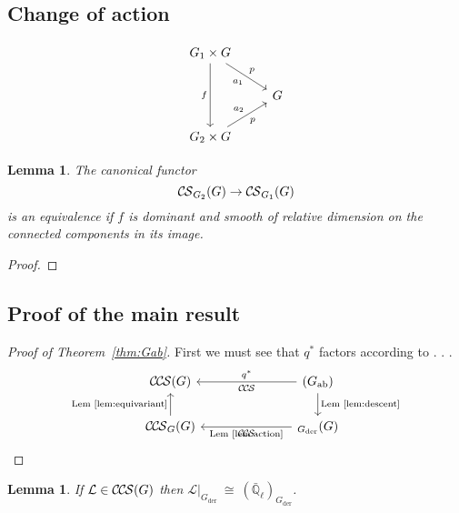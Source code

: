 \documentclass[10pt]{amsart}
\theoremstyle{plain}
\newtheorem{lemma}[theorem]{Lemma}
\theoremstyle{definition}
\newcommand{\EE}{\mathbb{\bar Q}_\ell}
\newcommand{\der}{_{\operatorname{der}}}
\newcommand{\ab}{_{\operatorname{ab}}}
\newcommand{\iso}{{\ \cong\ }}
\newcommand{\cs}[1]{{\mathcal{#1}}}
\newcommand{\CS}{{\mathcal{C\hskip-0.8pt S}}}
\newcommand{\CCS}{{\mathcal{C\hskip-.8pt C\hskip-0.8pt S}}}
\begin{document}
\subsection{Change of action}

\[
\begin{tikzcd}
\arrow{dd}[swap]{f} G_1 \times G \arrow{dr}[swap]{a_1}{p} & \\
& G \\
G_2 \times G \arrow{ur}{a_2}[swap]{p} & 
\end{tikzcd}
\]

\begin{lemma}\label{lem:action}
The canonical functor
\[
\CS_{G_2}(G) \to \CS_{G_1}(G)
\]
is an equivalence if $f$ is dominant and  smooth of relative dimension on the connected components in its image.
\end{lemma}
\begin{proof}
\end{proof}

\subsection{Proof of the main result}

\begin{proof}[Proof of Theorem~\ref{thm:Gab}]
First we must see that $q^*$ factors according to . . . 
\[
\begin{tikzcd}
 \CCS(G)  &&& \arrow{lll}[swap]{q^*}  \CCS(G\ab) \arrow{d}{\text{Lem~\ref{lem:descent}}} \\
\CCS_G(G)  \arrow{u}{\text{Lem~\ref{lem:equivariant}}} &&& \arrow{lll}{\text{Lem~\ref{lem:action}}} \CCS_{G\der}(G) 
\end{tikzcd}
\]
\end{proof}

\begin{lemma}\label{lem:Lder}
If $\cs{L}\in \CCS(G)$ then $\cs{L}\vert_{G\der} \iso (\EE)_{G\der}$.
\end{lemma}
\end{document}
